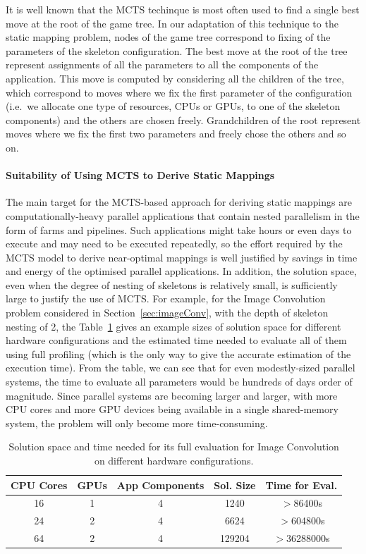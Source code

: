 \documentclass[smallextended]{svjour3}
\begin{document}
\noindent It is well known that the MCTS techinque is most often used
to find a single best move at the root of the game tree. In our
adaptation of this technique to the static mapping problem, nodes of
the game tree correspond to fixing of the parameters of the
skeleton configuration. The best
move at the root of the tree represent assignments of all the
parameters to all the components of the application. This move is
computed by considering all the children of the tree, which correspond
to moves where we fix the first parameter of the configuration
(i.e.~we allocate one type of resources, CPUs or GPUs, to one of the
skeleton components) and the others are chosen freely. Grandchildren
of the root represent moves where we fix the first two parameters and
freely chose the others and so on.  

\noindent
\paragraph{Suitability of Using MCTS to Derive Static Mappings} The
main target for the MCTS-based approach for deriving static mappings
are computationally-heavy parallel applications that contain nested
parallelism in the form of farms and pipelines. Such applications
might take hours or even days to execute and may need to be executed
repeatedly, so the effort required by the MCTS model to derive
near-optimal mappings is well justified by savings in time and energy
of the optimised parallel applications. In addition, the solution space,
even when the degree of nesting of skeletons is relatively small, is
sufficiently large to justify the use of MCTS. For example, for the
Image Convolution problem considered in Section~\ref{sec:imageConv},
with the depth of skeleton nesting of 2, the Table~\ref{tab:conv}
gives an example sizes of solution space for different hardware
configurations and the estimated time needed to evaluate all of them
using full profiling (which is the only way to give the accurate
estimation of the execution time). From the table, we can see that for
even modestly-sized parallel systems, the time to evaluate all
parameters would be hundreds of days order of magnitude. Since
parallel systems are becoming larger and larger, with more CPU cores
and more GPU devices being available in a single shared-memory system,
the problem will only become more time-consuming.

\begin{table}
  \begin{tabular}{|c|c|c|c|c|}
    \hline \hline
    \textbf{CPU Cores} & \textbf{GPUs} & \textbf{App Components} &
    \textbf{Sol. Size} & \textbf{Time for Eval.} \\
    \hline
    16 & 1 & 4 & 1240 & $>$86400s \\ \hline
    24 & 2 & 4 &6624 & $>$604800s \\ \hline
    64 & 2 & 4 & 129204 & $>$36288000s \\
    \hline \hline
  \end{tabular}
  \caption{Solution space and time needed for its full evaluation for
  Image Convolution on different hardware configurations.}
  \label{tab:conv}
\end{table}
\end{document}
